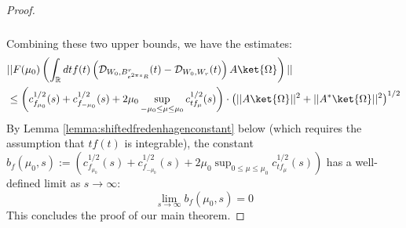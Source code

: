 \documentclass[a4paper,11pt]{article}
\theoremstyle{definition}
\theoremstyle{remark}
\newcommand{\lb}{\left(}
\newcommand{\rb}{\right)}
\begin{document}
\begin{proof}
\begin{align}
\begin{split}
        \end{split}
    \end{align}
    Combining these two upper bounds, we have the estimates:
    \begin{align}
        \begin{split}
            &||F(\mu_0)\lb\int_\mathbb{R} dt f(t)\lb\mathcal{D}_{W_0, B^r_{e^{2\pi s}R}}(t) - \mathcal{D}_{W_0, W_r}(t)\rb A\ket{\Omega}\rb||
            \\&
            \leq \lb c^{1/2}_{f_{\mu_0}}(s) + c^{1/2}_{f_{-\mu_0}}(s) + 2\mu_0\sup_{-\mu_0\leq \mu\leq \mu_0}c^{1/2}_{tf_\mu}(s) \rb\cdot\lb||A\ket{\Omega}||^2 + ||A^*\ket{\Omega}||^2\rb^{1/2}
        \end{split}
    \end{align}
    By Lemma \ref{lemma:shiftedfredenhagenconstant} below (which requires the assumption that $tf(t)$ is integrable), the constant $b_f(\mu_0, s) := \lb c^{1/2}_{f_{\mu_0}}(s) + c^{1/2}_{f_{-\mu_0}}(s) + 2\mu_0\sup_{0\leq \mu\leq \mu_0}c^{1/2}_{tf_\mu}(s)\rb$ has a well-defined limit as $s\rightarrow\infty$:
    \begin{equation}
        \lim_{s\rightarrow\infty}b_f(\mu_0, s) = 0
    \end{equation}
    This concludes the proof of our main theorem. 
\end{proof}
\end{document}
